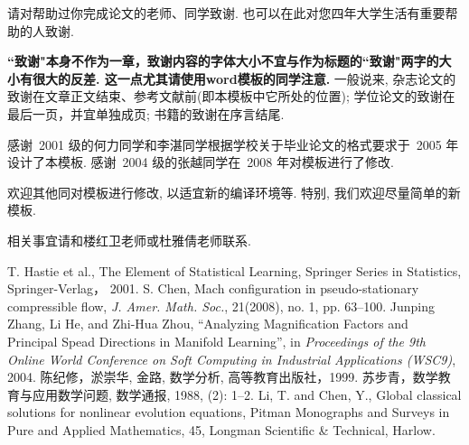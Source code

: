 \documentclass[notitlepage,cs4size,punct,oneside]{ctexrep}
\numberwithin{equation}{chapter}
\theoremstyle{mystyle}
\begin{document}
请对帮助过你完成论文的老师、同学致谢. 也可以在此对您四年大学生活有重要帮助的人致谢.

\textbf{``致谢"本身不作为一章，致谢内容的字体大小不宜与作为标题的``致谢"两字的大小有很大的反差. 这一点尤其请使用word模板的同学注意. } 一般说来, 杂志论文的致谢在文章正文结束、参考文献前(即本模板中它所处的位置);  学位论文的致谢在最后一页，并宜单独成页; 书籍的致谢在序言结尾.

感谢~2001 级的何力同学和李湛同学根据学校关于毕业论文的格式要求于~2005 年设计了本模板.
感谢~2004 级的张越同学在~2008 年对模板进行了修改.

欢迎其他同对模板进行修改, 以适宜新的编译环境等. 特别, 我们欢迎尽量简单的新模板.

相关事宜请和楼红卫老师或杜雅倩老师联系.

 \footnotesize
\begin{thebibliography}{99}
 T. Hastie et al., The Element of Statistical
Learning, Springer Series in Statistics, Springer-Verlag， 2001.
 S. Chen, Mach configuration in pseudo-stationary compressible
flow, \emph{J. Amer. Math. Soc.}, 21(2008), no. 1, pp. 63--100.
 Junping Zhang, Li He, and Zhi-Hua Zhou, ``Analyzing Magnification Factors
and Principal Spead Directions in Manifold Learning'', in
\emph{Proceedings of the 9th Online World Conference on Soft
Computing in Industrial Applications (WSC9)}, 2004.
 陈纪修，淤崇华, 金路, 数学分析, 高等教育出版社，1999.
 苏步青，数学教育与应用数学问题, 数学通报, 1988, (2): 1--2.
 Li, T. and Chen, Y., Global classical solutions for nonlinear
evolution equations, Pitman Monographs and Surveys in Pure and
Applied Mathematics, 45, Longman Scientific \& Technical, Harlow.
\end{thebibliography}



%
%
\end{document}
